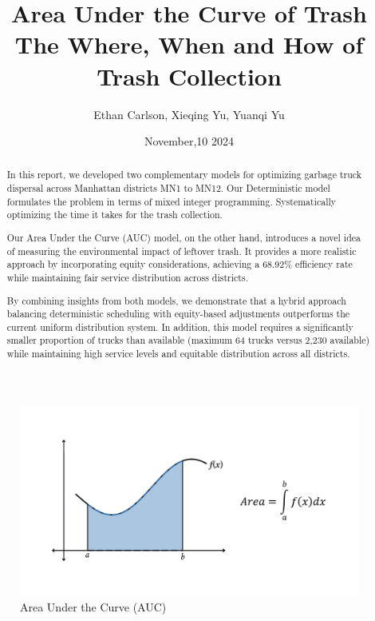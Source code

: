 \documentclass{article}
\title{Area Under the Curve of Trash \\
\large The Where, When and How of Trash Collection}
\author{Ethan Carlson, Xieqing Yu, Yuanqi Yu}
\date{November,10 2024}
\begin{document}
\maketitle
\begin{figure}[H]
    \centering
    \includegraphics[width=0.8\linewidth]{figures/cover.jpeg}
    \caption{Area Under the Curve (AUC)}
\end{figure}

\begin{abstract}
    


In this report, we developed two complementary models for optimizing garbage truck dispersal across Manhattan districts MN1 to MN12. Our Deterministic model formulates the problem in terms of mixed integer programming. Systematically optimizing the time it takes for the trash collection.

Our Area Under the Curve (AUC) model, on the other hand, introduces a novel idea of measuring the environmental impact of leftover trash. It provides a more realistic approach by incorporating equity considerations, achieving a 68.92\% efficiency rate while maintaining fair service distribution across districts. 

By combining insights from both models, we demonstrate that a hybrid approach balancing deterministic scheduling with equity-based adjustments outperforms the current uniform distribution system. In addition, this model requires a significantly smaller proportion of trucks than available (maximum 64 trucks versus 2,230 available) while maintaining high service levels and equitable distribution across all districts.


\end{abstract}
\newpage
\end{document}
